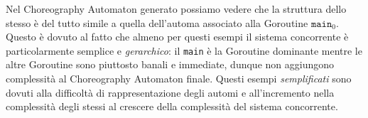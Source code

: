 Nel Choreography Automaton generato possiamo vedere che la struttura dello stesso è del tutto simile a quella dell'automa associato alla Goroutine $\texttt{main}_0$. Questo è dovuto al fatto che almeno per questi esempi il sistema concorrente è particolarmente semplice e \emph{gerarchico}: il \texttt{main} è la Goroutine dominante mentre le altre Goroutine sono piuttosto banali e immediate, dunque non aggiungono complessità al Choreography Automaton finale. Questi esempi \emph{semplificati} sono dovuti alla difficoltà di rappresentazione degli automi e all'incremento nella complessità degli stessi al crescere della complessità del sistema concorrente.
\begin{figure}[h!]
\end{figure}


